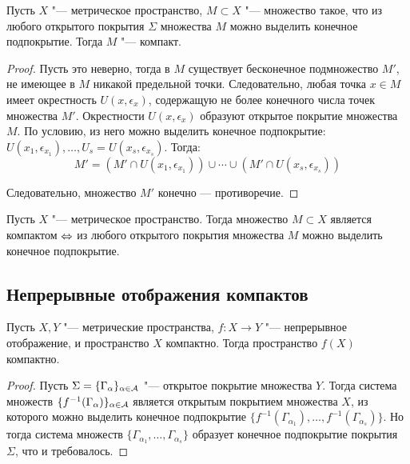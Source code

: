 \begin{theorem}
    Пусть $X$ "--- метрическое пространство, $M \subset X$ "--- множество такое, что из любого открытого покрытия $\Sigma$ множества $M$ можно выделить конечное подпокрытие. Тогда $M$ "--- компакт.
\end{theorem}

\begin{proof}
    Пусть это неверно, тогда в $M$ существует бесконечное подмножество $M'$, не имеющее в $M$ никакой предельной точки. Следовательно, любая точка $x \in M$ имеет окрестность $U(x, \epsilon_x)$, содержащую не более конечного числа точек множества $M'$. Окрестности $U(x, \epsilon_x)$ образуют открытое покрытие множества $M$. По условию, из него можно выделить конечное подпокрытие: $U(x_1, \epsilon_{x_1}), \ldots, U_s = U(x_s, \epsilon_{x_s})$. Тогда:
    \[M' = (M'\cap U(x_1, \epsilon_{x_1}))\cup\dotsb\cup (M'\cap U(x_s, \epsilon_{x_s}))\]
    
    Следовательно, множество $M'$ конечно --- противоречие.
\end{proof}

\begin{corollary}
    Пусть $X$ "--- метрическое пространство. Тогда множество $M \subset X$ является компактом $\Leftrightarrow$ из любого открытого покрытия множества $M$ можно выделить конечное подпокрытие.
\end{corollary}

\subsection{Непрерывные отображения компактов}

\begin{theorem}
	Пусть $X, Y$ "--- метрические пространства, $f : X \to Y$ "--- непрерывное отображение, и пространство $X$ компактно. Тогда пространство $f(X)$ компактно.
\end{theorem}

\begin{proof}
    Пусть $\Sigma = \lbrace \Gamma_{\alpha} \rbrace_{\alpha \in \mathcal A}$ "--- открытое покрытие множества $Y$. Тогда система множеств $\lbrace f^{-1}(\Gamma_{\alpha})\rbrace_{\alpha \in \mathcal A}$ является открытым покрытием множества $X$, из которого можно выделить конечное подпокрытие $\lbrace f^{-1}(\Gamma_{\alpha_1}), \ldots, f^{-1}(\Gamma_{\alpha_s})\rbrace$. Но тогда система множеств $\lbrace \Gamma_{\alpha_1}, \ldots, \Gamma_{\alpha_s}\rbrace$ образует конечное подпокрытие покрытия $\Sigma$, что и требовалось.
\end{proof}


